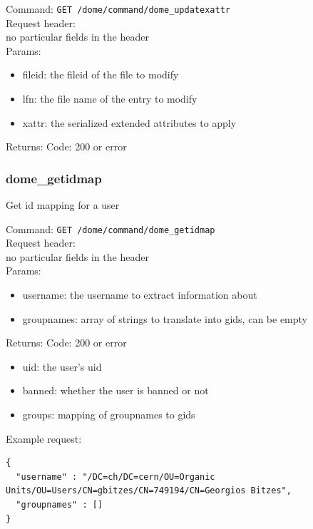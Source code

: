 \documentclass[a4paper,10pt]{scrreprt}
\begin{document}
Command:
\lstinline"GET /dome/command/dome_updatexattr"\\

Request header:\\
no particular fields in the header\\

Params:
\begin{itemize}
  \item fileid: the fileid of the file to modify
  \item lfn: the file name of the entry to modify
  \item xattr: the serialized extended attributes to apply
\end{itemize}

Returns:
Code: 200 or error






\subsubsection{dome\_getidmap}

Get id mapping for a user

Command:
\lstinline"GET /dome/command/dome_getidmap"\\

Request header:\\
no particular fields in the header\\

Params:
\begin{itemize}
 \item username: the username to extract information about
 \item groupnames: array of strings to translate into gids, can be empty
\end{itemize}

Returns:
Code: 200 or error
\begin{itemize}
 \item uid: the user's uid
 \item banned: whether the user is banned or not
 \item groups: mapping of groupnames to gids
\end{itemize}

Example request:\\
\begin{lstlisting}
{
  "username" : "/DC=ch/DC=cern/OU=Organic Units/OU=Users/CN=gbitzes/CN=749194/CN=Georgios Bitzes",
  "groupnames" : []
}
\end{lstlisting}
\end{document}
